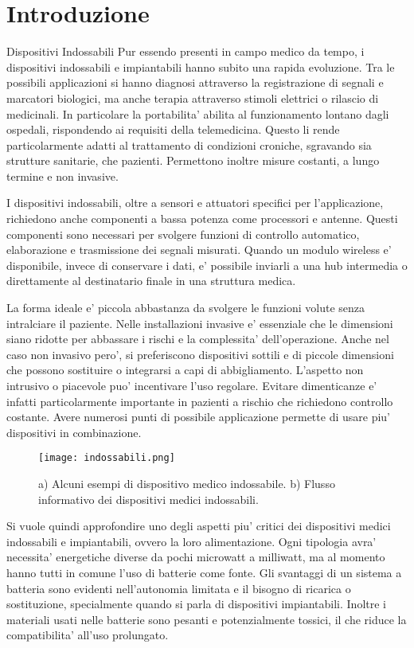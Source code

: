 \chapter{Introduzione}

\begin{section}{Dispositivi Indossabili}
    Pur essendo presenti in campo medico da tempo, i dispositivi indossabili e impiantabili hanno subito una rapida evoluzione. Tra le possibili applicazioni si hanno diagnosi attraverso la registrazione di segnali e marcatori biologici, ma anche terapia attraverso stimoli elettrici o rilascio di medicinali. In particolare la portabilita' abilita al funzionamento lontano dagli ospedali, rispondendo ai requisiti della telemedicina. Questo li rende particolarmente adatti al trattamento di condizioni croniche, sgravando sia strutture sanitarie, che pazienti. Permettono inoltre misure costanti, a lungo termine e non invasive. 

    I dispositivi indossabili, oltre a sensori e attuatori specifici per l'applicazione, richiedono anche componenti a bassa potenza come processori e antenne. Questi componenti sono necessari per svolgere funzioni di controllo automatico, elaborazione e trasmissione dei segnali misurati. Quando un modulo wireless e' disponibile, invece di conservare i dati, e' possibile inviarli a una hub intermedia o direttamente al destinatario finale in una struttura medica.

    La forma ideale e' piccola abbastanza da svolgere le funzioni volute senza intralciare il paziente. Nelle installazioni invasive e' essenziale che le dimensioni siano ridotte per abbassare i rischi e la complessita' dell'operazione. Anche nel caso non invasivo pero', si preferiscono dispositivi sottili e di piccole dimensioni che possono sostituire o integrarsi a capi di abbigliamento. L'aspetto non intrusivo o piacevole puo' incentivare l'uso regolare. Evitare dimenticanze e' infatti particolarmente importante in pazienti a rischio che richiedono controllo costante. Avere numerosi punti di possibile applicazione permette di usare piu' dispositivi in combinazione.

    \begin{figure}[H]
        \texttt{[image: indossabili.png]}
        \centering
        \caption{a) Alcuni esempi di dispositivo medico indossabile. b) Flusso informativo dei dispositivi medici indossabili.}
        \label{fig:indossabili}
    \end{figure}
    
    Si vuole quindi approfondire uno degli aspetti piu' critici dei dispositivi medici indossabili e impiantabili, ovvero la loro alimentazione. Ogni tipologia avra' necessita' energetiche diverse da pochi microwatt a milliwatt, ma al momento hanno tutti in comune l'uso di batterie come fonte. Gli svantaggi di un sistema a batteria sono evidenti nell'autonomia limitata e il bisogno di ricarica o sostituzione, specialmente quando si parla di dispositivi impiantabili. Inoltre i materiali usati nelle batterie sono pesanti e potenzialmente tossici, il che riduce la compatibilita' all'uso prolungato.
\end{section}

